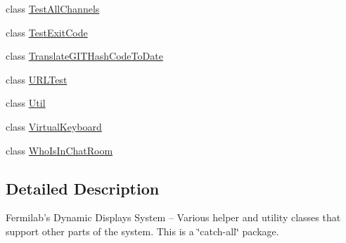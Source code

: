 \begin{DoxyCompactItemize}
\item 
class \hyperlink{classgov_1_1fnal_1_1ppd_1_1dd_1_1util_1_1TestAllChannels}{Test\-All\-Channels}
\item 
class \hyperlink{classgov_1_1fnal_1_1ppd_1_1dd_1_1util_1_1TestExitCode}{Test\-Exit\-Code}
\item 
class \hyperlink{classgov_1_1fnal_1_1ppd_1_1dd_1_1util_1_1TranslateGITHashCodeToDate}{Translate\-G\-I\-T\-Hash\-Code\-To\-Date}
\item 
class \hyperlink{classgov_1_1fnal_1_1ppd_1_1dd_1_1util_1_1URLTest}{U\-R\-L\-Test}
\item 
class \hyperlink{classgov_1_1fnal_1_1ppd_1_1dd_1_1util_1_1Util}{Util}
\item 
class \hyperlink{classgov_1_1fnal_1_1ppd_1_1dd_1_1util_1_1VirtualKeyboard}{Virtual\-Keyboard}
\item 
class \hyperlink{classgov_1_1fnal_1_1ppd_1_1dd_1_1util_1_1WhoIsInChatRoom}{Who\-Is\-In\-Chat\-Room}
\end{DoxyCompactItemize}


\subsection{Detailed Description}
Fermilab's Dynamic Displays System -- Various helper and utility classes that support other parts of the system. This is a \char`\"{}catch-\/all\char`\"{} package.
